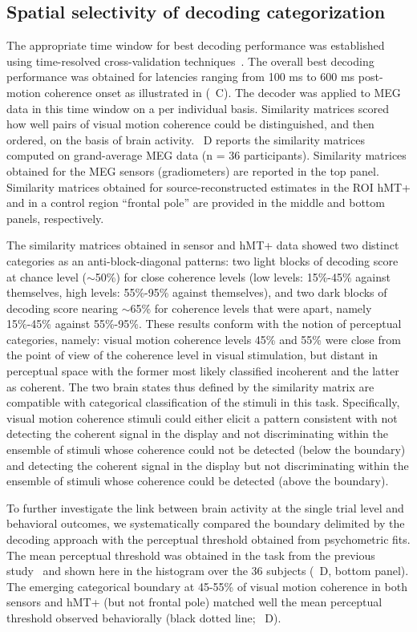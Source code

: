 \subsection*{Spatial selectivity of decoding categorization}
The appropriate time window for best decoding performance was established using time-resolved cross-validation techniques~\cite{21ramkumar2013feature}. The overall best decoding performance was obtained for latencies ranging from 100 ms to 600 ms post-motion coherence onset as illustrated in (~C). The decoder was applied to MEG data in this time window on a per individual basis. Similarity matrices scored how well pairs of visual motion coherence could be distinguished, and then ordered, on the basis of brain activity. ~D reports the similarity matrices computed on grand-average MEG data (n = 36 participants). Similarity matrices obtained for the MEG sensors (gradiometers) are reported in the top panel. Similarity matrices obtained for source-reconstructed estimates in the ROI hMT+ and in a control region “frontal pole” are provided in the middle and bottom panels, respectively. 

The similarity matrices obtained in sensor and hMT+ data showed two distinct categories as an anti-block-diagonal patterns: two light blocks of decoding score at chance level ($\sim$50\%) for close coherence levels (low levels: 15\%-45\% against themselves, high levels: 55\%-95\% against themselves), and two dark blocks of decoding score nearing $\sim$65\% for coherence levels that were apart, namely 15\%-45\% against 55\%-95\%. These results conform with the notion of perceptual categories, namely: visual motion coherence levels 45\% and 55\% were close from the point of view of the coherence level in visual stimulation, but distant in perceptual space with the former most likely classified incoherent and the latter as coherent. The two brain states thus defined by the similarity matrix are compatible with categorical classification of the stimuli in this task. Specifically, visual motion coherence stimuli could either elicit a pattern consistent with not detecting the coherent signal in the display and not discriminating within the ensemble of stimuli whose coherence could not be detected (below the boundary) and detecting the coherent signal in the display but not discriminating within the ensemble of stimuli whose coherence could be detected (above the boundary).

To further investigate the link between brain activity at the single trial level and  behavioral outcomes, we systematically compared the boundary delimited by the decoding approach with the perceptual threshold obtained from psychometric fits. The mean perceptual threshold was obtained in the task from the previous study~\cite{23zilber2014supramodal} and shown here in the histogram over the 36 subjects (~D, bottom panel). The emerging categorical boundary at 45-55\% of visual motion coherence in both sensors and hMT+ (but not frontal pole) matched well the mean perceptual threshold observed behaviorally (black dotted line; ~D). 

